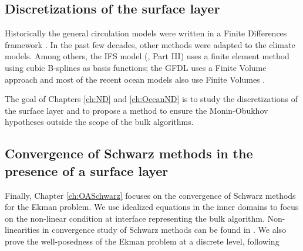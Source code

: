 \subsection{Discretizations of the surface layer}
Historically the general circulation models were written in
a Finite Differences framework \citep{randall_general_2000}. In the
past few decades, other methods were adapted to the
climate models. Among others, the IFS model
(\citep{ecmwf_ifs_2020}, Part III)
uses a finite element method using cubic B-splines as basis
functions;
the GFDL uses a Finite Volume approach
\citep{harris_scientific_2021}
and most of the recent ocean models also use
Finite Volumes \citep{griffies_fundamentals_2005}.
\par
{}
\par
{}
The goal of Chapters \ref{ch:ND} and \ref{ch:OceanND}
is to study the discretizations of the surface layer and
to propose a method to ensure the Monin-Obukhov hypotheses
outside the scope of the bulk algorithms.
\subsection{Convergence of Schwarz methods in the
presence of a surface layer}
Finally, Chapter \ref{ch:OASchwarz} focuses on the convergence
of Schwarz methods for the Ekman problem. We use idealized
equations in the inner domains to focus on the non-linear
condition at interface representing the bulk algorithm.
Non-linearities in convergence study of Schwarz methods
can be found in .
We also prove the well-posedness of the Ekman problem
at a discrete level, following
